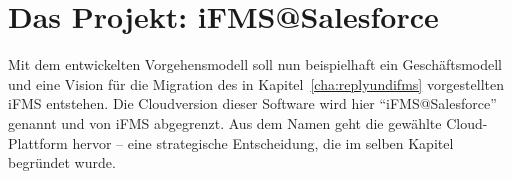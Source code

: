 \section{Das Projekt: iFMS@Salesforce}
\label{cha:result}
\begin{comment}
In Kapitel „Forschungsergebnisse“ stellen Sie die Ergebnisse ihrer Arbeit dar.
An dieser Stelle nehmen Sie noch keine Interpretation oder Erläuterung der 
Ergebnisse vor, sondern beschreiben rein deskriptiv ihre Befunde. Eine 
Auswertung findet im nachfolgenden Kapitel statt.
\end{comment}

Mit dem entwickelten Vorgehensmodell soll nun beispielhaft ein Geschäftsmodell 
und eine Vision für die Migration des in Kapitel~\ref{cha:replyundifms} 
vorgestellten iFMS entstehen. Die Cloudversion dieser Software wird hier 
"`iFMS@Salesforce"' genannt und von iFMS abgegrenzt. Aus dem Namen geht die 
gewählte Cloud-Plattform hervor -- eine strategische Entscheidung, die im selben 
Kapitel begründet wurde.

